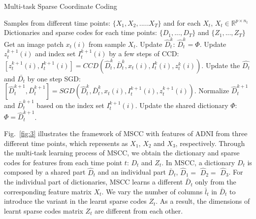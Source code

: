 \documentclass[10pt,twocolumn,letterpaper]{article}
\begin{document}
\setlength{\textfloatsep}{10pt}
\begin{algorithm}[t]
\caption{Multi-task Sparse Coordinate Coding }
\begin{algorithmic}[1]
   \Require Samples from different time points: $\{X_1, X_2,..... X_T\}$ and for each $X_t$, $X_t\in  \mathbb{R}^{p\times n_t} $
   \Ensure Dictionaries and sparse codes for each time points: $\{D_1,..., D_T\}$ and $\{Z_1,..., Z_T\}$
   \State Get an image patch $x_t(i)$ from sample $X_t$.
   \State  Update $\hat{D}^k_t$: $\hat{D}^k_t=\Phi$.
   \State Update $z_t^{k+1}(i)$ and index set $I_t^{k+1}(i)$ by a few steps of CCD:
   \State \quad \quad $[ z_t^{k+1}(i), I_t^{k+1}(i) ]= CCD(\hat{D}^k_t, \bar{D}^k_t, x_t(i), I_t^k(i), z_t^k(i))$.
   \State Update the $\hat{D_t}$ and $\bar{D_t}$ by one step SGD:
   \State \quad \quad $[\hat{D}^{k+1}_t,\bar{D}^{k+1}_t]= SGD(\hat{D}^k_t, \bar{D}^k_t, x_t(i), I_t^{k+1}(i), z_t^{k+1}(i) ) $.
   \State Normalize $\hat{D}^{k+1}_t$ and $\bar{D}^{k+1}_t$ based on the index set $I_t^{k+1}(i)$.
   \State Update the shared dictionary $\Phi$: $\Phi=\hat{D}^{k+1}_t$.
   \EndFor
   \EndFor
   \EndFor
\end{algorithmic}
\label{alg:2}
\end{algorithm}

Fig.~\ref{fig:3} illustrates the framework of MSCC with features of ADNI from three different time points, which represents as $X_1$, $X_2$ and $X_3$, respectively. Through the multi-task learning process of MSCC, we obtain the dictionary and sparse codes for features from each time point $t$: $D_t$ and $Z_t$. In MSCC, a dictionary $D_t$ is composed by a shared part $\hat{D}_t$ and an individual part $\bar{D}_t$, $\hat{D}_1 =$ $\hat{D}_2 =$ $\hat{D}_3$. For the individual part of dictionaries, MSCC learns a different $\bar{D}_t$ only from the corresponding feature matrix $X_t$. We vary the number of columns  $\bar{l}_t$ in $\bar{D}_t$ to introduce the variant in the learnt sparse codes $Z_t$. As a result, the dimensions of learnt sparse codes matrix $Z_t$ are different from each other.
\end{document}
